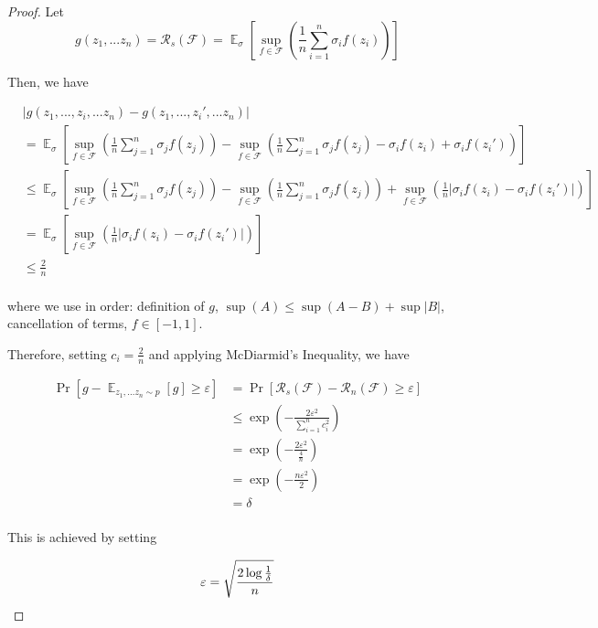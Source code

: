 \documentclass[11pt]{article}
\DeclareMathOperator*{\E}{\mathbb{E}}
\begin{document}
\begin{proof}
Let 
\begin{equation}
    g(z_1,...z_n) = \mathcal{R}_s(\mathcal{F}) = \E_{\sigma} \left[ \sup_{f \in \mathcal{F}} \left( \frac{1}{n} \sum_{i=1}^n \sigma_i f(z_i) \right) \right]
\end{equation}

Then, we have

\begin{align*}
    &\left| g(z_1,...,z_i,...z_n) - g(z_1,...,z_i',...z_n) \right| \\
    &= \E_{\sigma} \left[ \sup_{f \in \mathcal{F}} \left( \frac{1}{n} \sum_{j=1}^{n} \sigma_j f(z_j) \right) - \sup_{f \in \mathcal{F}} \left( \frac{1}{n} \sum_{j=1}^n \sigma_j f(z_j)  - \sigma_i f(z_i) + \sigma_i f(z_i') \right) \right] \\
    &\leq \E_{\sigma} \left[ \sup_{f \in \mathcal{F}} \left( \frac{1}{n} \sum_{j=1}^n \sigma_j f(z_j) \right) - \sup_{f \in \mathcal{F}}  \left( \frac{1}{n} \sum_{j=1}^n \sigma_j f(z_j) \right) + \sup_{f \in \mathcal{F}} \left( \frac{1}{n} \left| \sigma_i f(z_i) - \sigma_i f(z_i') \right| \right) \right]\\
    &= \E_{\sigma} \left[ \sup_{f \in \mathcal{F}} \left( \frac{1}{n} \left| \sigma_i f(z_i) - \sigma_i f(z_i') \right| \right) \right]\\
    &\leq \frac{2}{n}\\
\end{align*}

where we use in order: definition of $g$, $\sup(A) \leq \sup(A-B) + \sup|B|$, cancellation of terms, $f \in [-1,1]$.

Therefore, setting $c_i = \frac{2}{n}$ and applying McDiarmid's Inequality, we have

\begin{align*}
\Pr\left[ g - \E_{z_1,...z_n \sim p}[g] \geq \varepsilon \right] 
&= \Pr\left[ \mathcal{R}_s(\mathcal{F}) - \mathcal{R}_n(\mathcal{F}) \geq \varepsilon \right]\\
&\leq \exp{\left( - \frac{2\varepsilon^2}{\sum_{i=1}^n c_i^2} \right)}\\
&= \exp{\left( - \frac{2\varepsilon^2}{\frac{4}{n}} \right)}\\
&= \exp{\left( - \frac{n\varepsilon^2}{2} \right)}\\
&= \delta\\
\end{align*}

This is achieved by setting

\[ \varepsilon = \sqrt{\frac{2\log{\frac{1}{\delta}}}{n}} \qedhere\] 
\end{proof}
\end{document}
